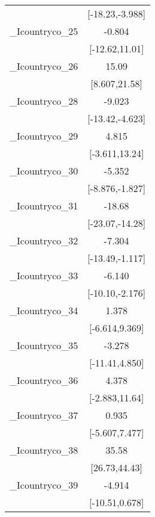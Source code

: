 {\begin{tabular}{l*{1}{c}}
            &       [-18.23,-3.988]         \\
[1em]
\_Icountryco\_25&                -0.804         \\
            &        [-12.62,11.01]         \\
[1em]
\_Icountryco\_26&                 15.09\sym{***}\\
            &         [8.607,21.58]         \\
[1em]
\_Icountryco\_28&                -9.023\sym{***}\\
            &       [-13.42,-4.623]         \\
[1em]
\_Icountryco\_29&                 4.815         \\
            &        [-3.611,13.24]         \\
[1em]
\_Icountryco\_30&                -5.352\sym{**} \\
            &       [-8.876,-1.827]         \\
[1em]
\_Icountryco\_31&                -18.68\sym{***}\\
            &       [-23.07,-14.28]         \\
[1em]
\_Icountryco\_32&                -7.304\sym{*}  \\
            &       [-13.49,-1.117]         \\
[1em]
\_Icountryco\_33&                -6.140\sym{**} \\
            &       [-10.10,-2.176]         \\
[1em]
\_Icountryco\_34&                 1.378         \\
            &        [-6.614,9.369]         \\
[1em]
\_Icountryco\_35&                -3.278         \\
            &        [-11.41,4.850]         \\
[1em]
\_Icountryco\_36&                 4.378         \\
            &        [-2.883,11.64]         \\
[1em]
\_Icountryco\_37&                 0.935         \\
            &        [-5.607,7.477]         \\
[1em]
\_Icountryco\_38&                 35.58\sym{***}\\
            &         [26.73,44.43]         \\
[1em]
\_Icountryco\_39&                -4.914         \\
            &        [-10.51,0.678]         \\

\end{tabular}}
